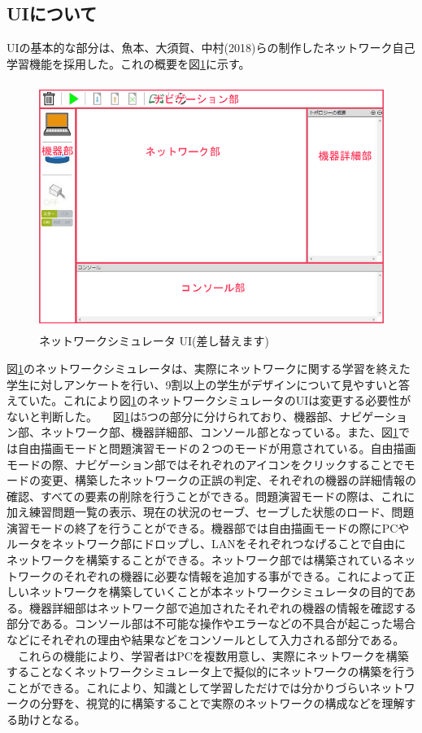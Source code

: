 \subsection{UIについて}
\label{tag:ui}
UIの基本的な部分は、魚本、大須賀、中村(2018)らの制作したネットワーク自己学習機能を採用した。これの概要を図\ref{fig:simu}に示す。

\begin{figure}[htbp]
  \begin{center}
    \includegraphics[clip,width=12.0cm,height=8.0cm]{img/simu.png}
    \caption{ネットワークシミュレータ UI(差し替えます)}
    \label{fig:simu}
  \end{center}
\end{figure}

図\ref{fig:simu}のネットワークシミュレータは、実際にネットワークに関する学習を終えた学生に対しアンケートを行い、9割以上の学生がデザインについて見やすいと答えていた。これにより図\ref{fig:simu}のネットワークシミュレータのUIは変更する必要性がないと判断した。
　図\ref{fig:simu}は5つの部分に分けられており、機器部、ナビゲーション部、ネットワーク部、機器詳細部、コンソール部となっている。また、図\ref{fig:simu}では自由描画モードと問題演習モードの２つのモードが用意されている。自由描画モードの際、ナビゲーション部ではそれぞれのアイコンをクリックすることでモードの変更、構築したネットワークの正誤の判定、それぞれの機器の詳細情報の確認、すべての要素の削除を行うことができる。問題演習モードの際は、これに加え練習問題一覧の表示、現在の状況のセーブ、セーブした状態のロード、問題演習モードの終了を行うことができる。機器部では自由描画モードの際にPCやルータをネットワーク部にドロップし、LANをそれぞれつなげることで自由にネットワークを構築することができる。ネットワーク部では構築されているネットワークのそれぞれの機器に必要な情報を追加する事ができる。これによって正しいネットワークを構築していくことが本ネットワークシミュレータの目的である。機器詳細部はネットワーク部で追加されたそれぞれの機器の情報を確認する部分である。コンソール部は不可能な操作やエラーなどの不具合が起こった場合などにそれぞれの理由や結果などをコンソールとして入力される部分である。\\
　これらの機能により、学習者はPCを複数用意し、実際にネットワークを構築することなくネットワークシミュレータ上で擬似的にネットワークの構築を行うことができる。これにより、知識として学習しただけでは分かりづらいネットワークの分野を、視覚的に構築することで実際のネットワークの構成などを理解する助けとなる。

